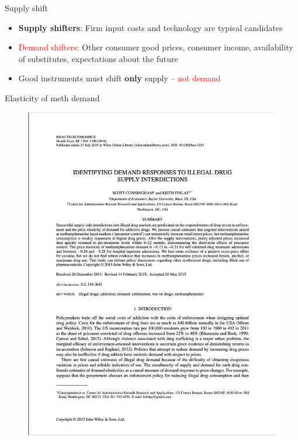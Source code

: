 \documentclass{beamer}
\begin{document}
\begin{frame}{Supply shift}

\begin{itemize}
\item \textbf{Supply shifters}: Firm input costs and technology are typical candidates
\item \textcolor{red}{Demand shifters}: Other consumer good prices, consumer income, availability of substitutes, expectations about the future
\item Good instruments must shift \textbf{only} supply -- \textcolor{red}{not demand}
\end{itemize}

\end{frame}

\begin{frame}{Elasticity of meth demand}

	\begin{figure}
	\includegraphics[scale=0.25]{./lecture_includes/he_1}
	\end{figure}
\end{frame}
\end{document}
